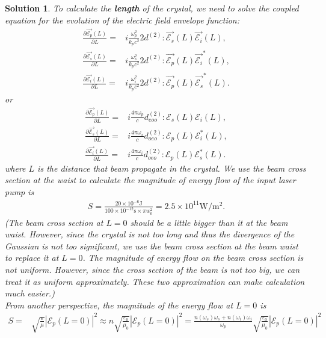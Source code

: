 \documentclass[UTF8,10pt,a4paper]{article}
\theoremstyle{Problem}
\theoremstyle{Solution}
\newtheorem*{sol}{Solution}
\providecommand{\abs}[1]{\left\lvert#1\right\rvert}
\begin{document}
\begin{sol}
    To calculate the \textbf{length} of the crystal, we need to solve the coupled equation for the evolution of the electric field envelope function:
    \begin{align}
        \frac{\partial\vec{\mathscr{E}_p}(L)}{\partial L}=&i\frac{\omega_p^2}{k_pc^2}2d^{(2)}:\vec{\mathscr{E}_s}(L)\vec{\mathscr{E}_i}(L),\\
        \frac{\partial\vec{\mathscr{E}_s}(L)}{\partial L}=&i\frac{\omega_s^2}{k_pc^2}2d^{(2)}:\vec{\mathscr{E}_p}(L)\vec{\mathscr{E}_i}^*(L),\\
        \frac{\partial\vec{\mathscr{E}_i}(L)}{\partial L}=&i\frac{\omega_i^2}{k_pc^2}2d^{(2)}:\vec{\mathscr{E}_p}(L)\vec{\mathscr{E}_s}^*(L).
    \end{align}
    or
    \begin{align}
        \label{CWE-1}
        \frac{\partial\vec{\mathscr{E}_p}(L)}{\partial L}=&i\frac{4\pi\omega_p}{c}d_{eoo}^{(2)}:\mathscr{E}_s(L)\mathscr{E}_i(L),\\
        \label{CWE-2}
        \frac{\partial\vec{\mathscr{E}_s}(L)}{\partial L}=&i\frac{4\pi\omega_s}{c}d_{oeo}^{(2)}:\mathscr{E}_p(L)\mathscr{E}_i^*(L),\\
        \label{CWE-3}
        \frac{\partial\vec{\mathscr{E}_i}(L)}{\partial L}=&i\frac{4\pi\omega_i}{c}d_{oeo}^{(2)}:\mathscr{E}_p(L)\mathscr{E}_s^*(L).
    \end{align}
    where $L$ is the distance that beam propagate in the crystal. We use the beam cross section at the waist to calculate the magnitude of energy flow of the input laser pump is
    \begin{align}
        S=\frac{20\times 10^{-6}\text{J}}{100\times 10^{-12}\text{s}\times \pi w_0^2}=2.5\times 10^{11}\text{W}/\text{m}^2.
    \end{align}
    (The beam cross section at $L=0$ should be a little bigger than it at the beam waist. However, since the crystal is not too long and thus the divergence of the Gaussian is not too significant, we use the beam cross section at the beam waist to replace it at $L=0$. The magnitude of energy flow on the beam cross section is not uniform. However, since the cross section of the beam is not too big, we can treat it as uniform approximately. These two approximation can make calculation much easier.)\\
    From another perspective, the magnitude of the energy flow at $L=0$ is
    \begin{align}
        \nonumber S=&\sqrt{\frac{\varepsilon}{\mu}}\abs{\mathscr{E}_p(L=0)}^2\approx n\sqrt{\frac{\varepsilon_0}{\mu_0}}\abs{\mathscr{E}_p(L=0)}^2=\frac{n(\omega_s)\omega_s+n(\omega_i)\omega_i}{\omega_p}\sqrt{\frac{\varepsilon_0}{\mu_0}}\abs{\mathscr{E}_p(L=0)}^2\\

\end{align}
\end{sol}
\end{document}
